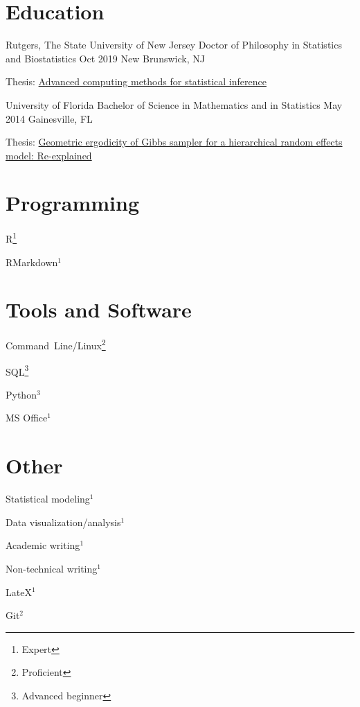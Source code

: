 \documentclass[letterpaper]{resume_config}
\begin{document}

\section{Education}

\EducationExperience
    {Rutgers, The State University of New Jersey} %
    {Doctor of Philosophy in Statistics and Biostatistics} %
    {Oct 2019} %
    {New Brunswick, NJ} %
    {\item Thesis: \href{    https://rucore.libraries.rutgers.edu/rutgers-lib/61966/}{Advanced computing methods for statistical inference} 
    }

\EducationExperience
    {University of Florida} %
    {Bachelor of Science in Mathematics and in Statistics} %
    {May 2014} %
    {Gainesville, FL} %
    {\item Thesis: \href{https://ufdc.ufl.edu/AA00057032/00001}{Geometric ergodicity of Gibbs sampler for a hierarchical random effects model: Re-explained}}


\section{Programming}
\begin{SkillsList}
    \item R\footnote{Expert} 
    \item RMarkdown$^1$
\end{SkillsList}

\section{Tools and Software}
\begin{SkillsList}
    \item Command~Line/Linux\footnote{Proficient} 
    \item SQL\footnote{Advanced beginner} 
    \item Python$^3$
    \item MS Office$^1$
\end{SkillsList}

\section{Other}
\begin{SkillsList}
    \item Statistical modeling$^1$
    \item Data visualization/analysis$^1$ 
    \item Academic writing$^1$
    \item Non-technical writing$^1$
    \item LateX$^1$ 
    \item Git$^2$
\end{SkillsList}
\end{document}
